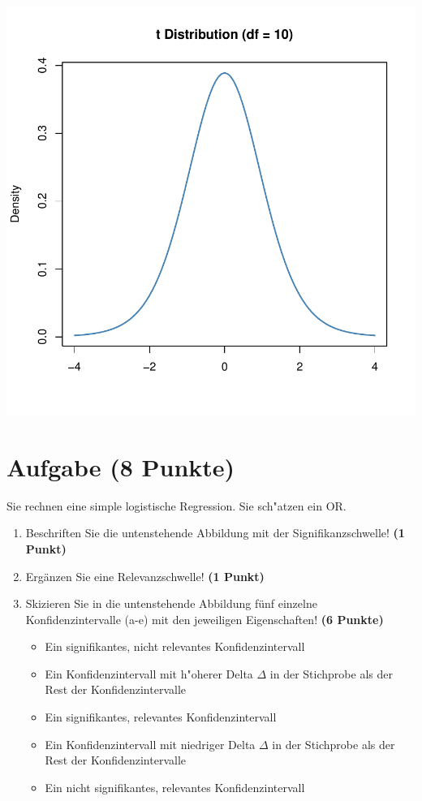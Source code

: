 \documentclass[a4paper, 10pt]{scrartcl}\usepackage[]{graphicx}\usepackage[]{xcolor}
\makeatletter
\def\maxwidth{ %
  \ifdim\Gin@nat@width>\linewidth
    \linewidth
  \else
    \Gin@nat@width
  \fi
}
\makeatother
\begin{document}
{\centering \includegraphics[width=\maxwidth]{img/statistisches-testen-3-1} 

}


 
\clearpage

\section{Aufgabe \hfill (8 Punkte)}



Sie rechnen eine simple logistische Regression. Sie sch{"a}tzen ein OR. 

\begin{enumerate}
\item Beschriften Sie die untenstehende Abbildung mit der
  Signifikanzschwelle! \textbf{(1 Punkt)}
\item Erg{\"a}nzen Sie eine Relevanzschwelle! \textbf{(1 Punkt)} 
\item Skizieren Sie in die
  untenstehende Abbildung f{\"u}nf einzelne Konfidenzintervalle (a-e) mit den
  jeweiligen Eigenschaften! \textbf{(6 Punkte)}
  \begin{itemize}
  \item[(a)] Ein signifikantes, nicht relevantes Konfidenzintervall 	
  \item[(b)] Ein Konfidenzintervall mit h{"o}herer Delta $\Delta$ in der Stichprobe als der Rest der Konfidenzintervalle 	
  \item[(c)] Ein signifikantes, relevantes Konfidenzintervall 	
  \item[(d)] Ein Konfidenzintervall mit niedriger Delta $\Delta$ in der Stichprobe als der Rest der Konfidenzintervalle 
  \item[(e)] Ein nicht signifikantes, relevantes Konfidenzintervall
  \end{itemize}
\end{enumerate}
\end{document}
